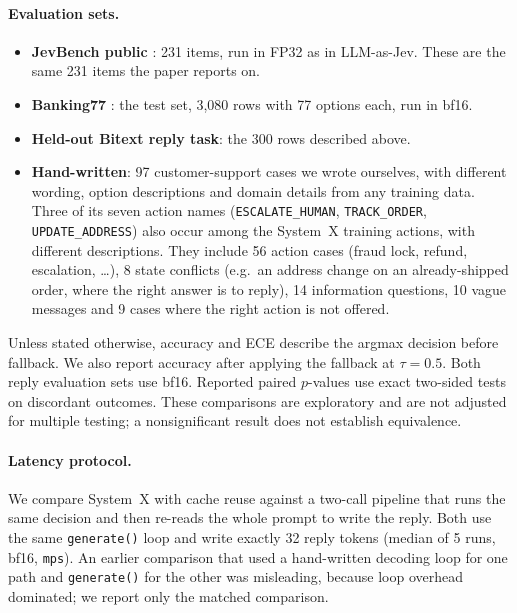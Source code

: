 \documentclass[11pt]{article}
\begin{document}
\paragraph{Evaluation sets.}
\begin{itemize}
\item \textbf{JevBench public} \citep{jevbench2026}: 231 items, run in FP32 as in LLM-as-Jev. These are the same 231 items the paper reports on.
\item \textbf{Banking77} \citep{casanueva2020banking77}: the test set, 3{,}080 rows with 77 options each, run in bf16.
\item \textbf{Held-out Bitext reply task}: the 300 rows described above.
\item \textbf{Hand-written}: 97 customer-support cases we wrote ourselves, with different wording, option descriptions and domain details from any training data. Three of its seven action names (\texttt{ESCALATE\_HUMAN}, \texttt{TRACK\_ORDER}, \texttt{UPDATE\_ADDRESS}) also occur among the System~X training actions, with different descriptions. They include 56 action cases (fraud lock, refund, escalation, \dots), 8 state conflicts (e.g.\ an address change on an already-shipped order, where the right answer is to reply), 14 information questions, 10 vague messages and 9 cases where the right action is not offered.
\end{itemize}
Unless stated otherwise, accuracy and ECE describe the argmax decision before fallback. We also report accuracy after applying the fallback at $\tau=0.5$. Both reply evaluation sets use bf16. Reported paired $p$-values use exact two-sided tests on discordant outcomes. These comparisons are exploratory and are not adjusted for multiple testing; a nonsignificant result does not establish equivalence.

\paragraph{Latency protocol.} We compare System~X with cache reuse against a two-call pipeline that runs the same decision and then re-reads the whole prompt to write the reply. Both use the same \texttt{generate()} loop and write exactly 32 reply tokens (median of 5 runs, bf16, \texttt{mps}). An earlier comparison that used a hand-written decoding loop for one path and \texttt{generate()} for the other was misleading, because loop overhead dominated; we report only the matched comparison.

\end{document}
